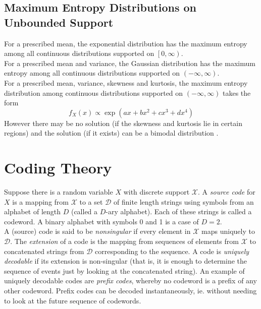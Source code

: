\documentclass[11pt]{report} %
\begin{document}
\subsection{Maximum Entropy Distributions on Unbounded Support}

For a prescribed mean, the exponential distribution has the maximum entropy among all continuous distributions supported on $\left[0, \infty\right)$. \\

For a prescribed mean and variance, the Gaussian distribution has the maximum entropy among all continuous distributions supported on $\left(-\infty, \infty\right)$. \\

For a prescribed mean, variance, skewness and kurtosis, the maximum entropy distribution among continuous distributions supported on $\left(-\infty, \infty\right)$ takes the form
\begin{equation}
f_{X}\left(x\right) \propto \exp\left(ax + bx^{2} + cx^{3} + dx^{4}\right)
\end{equation}
However there may be no solution (if the skewness and kurtosis lie in certain regions) and the solution (if it exists) can be a bimodal distribution \cite{Rockinger2002}.

\section{Coding Theory \cite{Cover2006}}

Suppose there is a random variable $X$ with discrete support $\mathcal{X}$. A \textit{source code} for $X$ is a mapping from $\mathcal{X}$ to a set $\mathcal{D}$ of finite length strings using symbols from an alphabet of length $D$ (called a $D$-ary alphabet). Each of these strings is called a codeword. A binary alphabet with symbols 0 and 1 is a case of $D = 2$. \\

A (source) code is said to be \textit{nonsingular} if every element in $\mathcal{X}$ maps uniquely to $\mathcal{D}$. The \textit{extension} of a code is the mapping from sequences of elements from $\mathcal{X}$ to concatenated strings from $\mathcal{D}$ corresponding to the sequence. A code is \textit{uniquely decodable} if its extension is non-singular (that is, it is enough to determine the sequence of events just by looking at the concatenated string). An example of uniquely decodable codes are \textit{prefix codes}, whereby no codeword is a prefix of any other codeword. Prefix codes can be decoded instantaneously, ie. without needing to look at the future sequence of codewords. \\
\end{document}

